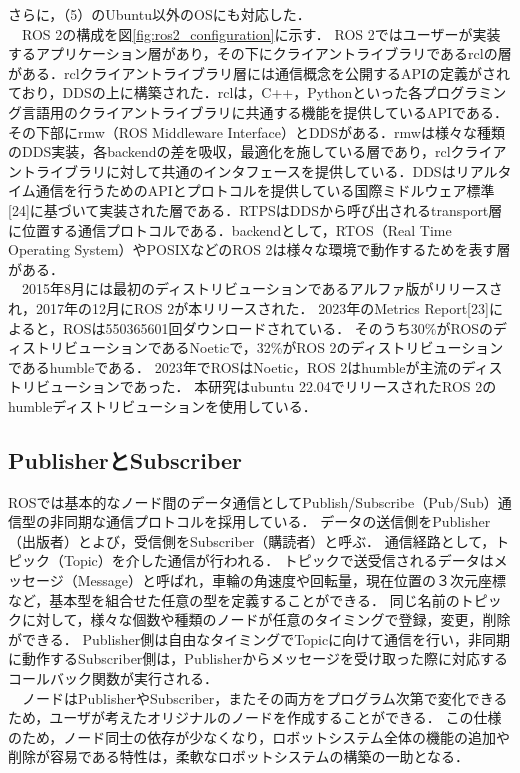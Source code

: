 さらに，（5）のUbuntu以外のOSにも対応した．
\\　ROS 2の構成を図\ref{fig:ros2_configuration}に示す．
ROS 2ではユーザーが実装するアプリケーション層があり，その下にクライアントライブラリであるrclの層がある．rclクライアントライブラリ層には通信概念を公開するAPIの定義がされており，DDSの上に構築された．rclは，C++，Pythonといった各プログラミング言語用のクライアントライブラリに共通する機能を提供しているAPIである．その下部にrmw（ROS Middleware Interface）とDDSがある．rmwは様々な種類のDDS実装，各backendの差を吸収，最適化を施している層であり，rclクライアントライブラリに対して共通のインタフェースを提供している．DDSはリアルタイム通信を行うためのAPIとプロトコルを提供している国際ミドルウェア標準[24]に基づいて実装された層である．RTPSはDDSから呼び出されるtransport層に位置する通信プロトコルである．backendとして，RTOS（Real Time Operating System）やPOSIXなどのROS 2は様々な環境で動作するためを表す層がある．
\\　2015年8月には最初のディストリビューションであるアルファ版がリリースされ，2017年の12月にROS 2が本リリースされた．
2023年のMetrics Report[23]によると，ROSは550365601回ダウンロードされている．
そのうち30\%がROSのディストリビューションであるNoeticで，32\%がROS 2のディストリビューションであるhumbleである．
2023年でROSはNoetic，ROS 2はhumbleが主流のディストリビューションであった．
本研究はubuntu 22.04でリリースされたROS 2のhumbleディストリビューションを使用している．
\subsection{PublisherとSubscriber}
ROSでは基本的なノード間のデータ通信としてPublish/Subscribe（Pub/Sub）通信型の非同期な通信プロトコルを採用している．
データの送信側をPublisher（出版者）とよび，受信側をSubscriber（購読者）と呼ぶ．
通信経路として，トピック（Topic）を介した通信が行われる．
トピックで送受信されるデータはメッセージ（Message）と呼ばれ，車輪の角速度や回転量，現在位置の３次元座標など，基本型を組合せた任意の型を定義することができる．
同じ名前のトピックに対して，様々な個数や種類のノードが任意のタイミングで登録，変更，削除ができる．
Publisher側は自由なタイミングでTopicに向けて通信を行い，非同期に動作するSubscriber側は，Publisherからメッセージを受け取った際に対応するコールバック関数が実行される．
\\　ノードはPublisherやSubscriber，またその両方をプログラム次第で変化できるため，ユーザが考えたオリジナルのノードを作成することができる．
この仕様のため，ノード同士の依存が少なくなり，ロボットシステム全体の機能の追加や削除が容易である特性は，柔軟なロボットシステムの構築の一助となる．
